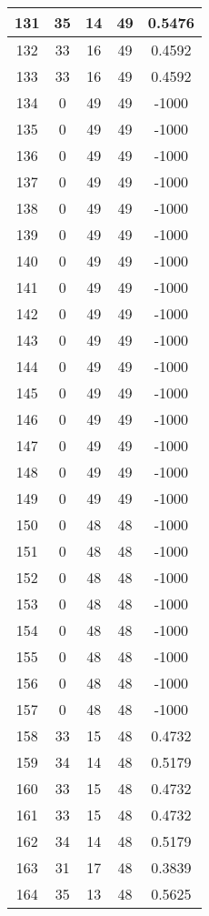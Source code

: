 \documentclass[letterpaper, 12pt]{article}
\begin{document}
\begin{longtable}{|c|c|c|c|c|}
\hline
131 & 35 & 14 & 49 & 0.5476 \\
\hline
132 & 33 & 16 & 49 & 0.4592 \\
\hline
133 & 33 & 16 & 49 & 0.4592 \\
\hline
134 & 0 & 49 & 49 & -1000 \\
\hline
135 & 0 & 49 & 49 & -1000 \\
\hline
136 & 0 & 49 & 49 & -1000 \\
\hline
137 & 0 & 49 & 49 & -1000 \\
\hline
138 & 0 & 49 & 49 & -1000 \\
\hline
139 & 0 & 49 & 49 & -1000 \\
\hline
140 & 0 & 49 & 49 & -1000 \\
\hline
141 & 0 & 49 & 49 & -1000 \\
\hline
142 & 0 & 49 & 49 & -1000 \\
\hline
143 & 0 & 49 & 49 & -1000 \\
\hline
144 & 0 & 49 & 49 & -1000 \\
\hline
145 & 0 & 49 & 49 & -1000 \\
\hline
146 & 0 & 49 & 49 & -1000 \\
\hline
147 & 0 & 49 & 49 & -1000 \\
\hline
148 & 0 & 49 & 49 & -1000 \\
\hline
149 & 0 & 49 & 49 & -1000 \\
\hline
150 & 0 & 48 & 48 & -1000 \\
\hline
151 & 0 & 48 & 48 & -1000 \\
\hline
152 & 0 & 48 & 48 & -1000 \\
\hline
153 & 0 & 48 & 48 & -1000 \\
\hline
154 & 0 & 48 & 48 & -1000 \\
\hline
155 & 0 & 48 & 48 & -1000 \\
\hline
156 & 0 & 48 & 48 & -1000 \\
\hline
157 & 0 & 48 & 48 & -1000 \\
\hline
158 & 33 & 15 & 48 & 0.4732 \\
\hline
159 & 34 & 14 & 48 & 0.5179 \\
\hline
160 & 33 & 15 & 48 & 0.4732 \\
\hline
161 & 33 & 15 & 48 & 0.4732 \\
\hline
162 & 34 & 14 & 48 & 0.5179 \\
\hline
163 & 31 & 17 & 48 & 0.3839 \\
\hline
164 & 35 & 13 & 48 & 0.5625 \\

\end{longtable}
\end{document}
